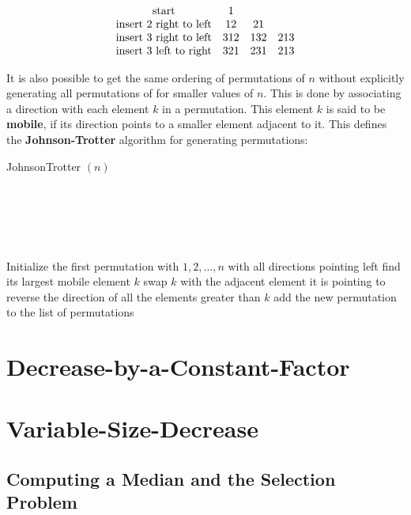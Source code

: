\documentclass[12pt letter]{report}
\begin{document}
\begin{align*}
  \begin{array}{c c c c}
    \text{start}                  & 1   &     &     \\
    \text{insert 2 right to left} & 12  & 21  &     \\
    \text{insert 3 right to left} & 312 & 132 & 213 \\
    \text{insert 3 left to right} & 321 & 231 & 213
  \end{array}
\end{align*}

It is also possible to get the same ordering of permutations of $n$ without explicitly generating all permutations of
for smaller values of $n$. This is done by associating a direction with each element $k$ in a permutation. This element
$k$ is said to be \textbf{mobile}, if its direction points to a smaller element adjacent to it. This defines the
\textbf{Johnson-Trotter} algorithm for generating permutations:
\begin{algorithm}[H]
  \caption{JohnsonTrotter $ \left( n \right) $}
  \Comment{}\\
   \\
   \\
   \\
  \begin{algorithmic}[1]
    \State Initialize the first permutation with $1, 2, \ldots, n$ with all directions pointing left
    \State find its largest mobile element $k$
    \State swap $k$ with the adjacent element it is pointing to
    \State reverse the direction of all the elements greater than $k$
    \State add the new permutation to the list of permutations
    \EndWhile
  \end{algorithmic}
\end{algorithm}

\chapter{Decrease-by-a-Constant-Factor}

\chapter{Variable-Size-Decrease}
\section{Computing a Median and the Selection Problem}
\end{document}
